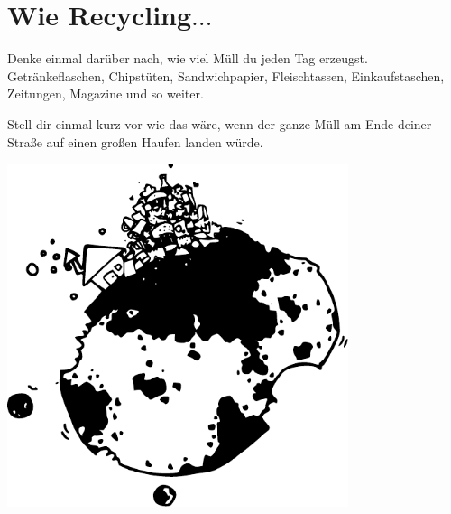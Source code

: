 

\chapter{Wie Recycling$\ldots$}\label{ch:sortoflikerecycling}

Denke einmal darüber nach, wie viel Müll du jeden Tag erzeugst. Getränkeflaschen, Chipstüten, Sandwichpapier, Fleischtassen, Einkaufstaschen, Zeitungen, Magazine und so weiter.
\par
Stell dir einmal kurz vor wie das wäre, wenn der ganze Müll am Ende deiner Straße auf einen großen Haufen landen würde.

\begin{center}
\includegraphics*[width=100mm]{images/trash}
\end{center}

